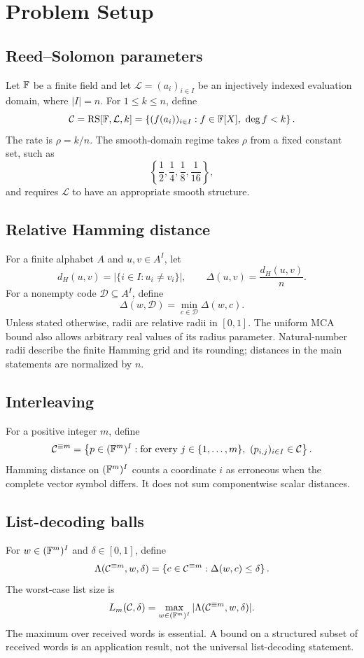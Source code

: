 \section{Problem Setup}

\subsection{Reed--Solomon parameters}

Let \(\mathbb{F}\) be a finite field and let
\(\mathcal L=(a_i)_{i\in I}\) be an injectively indexed evaluation domain,
where \(|I|=n\).  For \(1\le k\le n\), define
\[
  \mathcal C=\operatorname{RS}[\mathbb{F},\mathcal L,k]
  =
  \left\{
    (f(a_i))_{i\in I}:
    f\in\mathbb{F}[X],\ \deg f<k
  \right\}.
\]
The rate is \(\rho=k/n\).  The smooth-domain regime takes \(\rho\) from a fixed
constant set, such as
\[
  \left\{\frac12,\frac14,\frac18,\frac1{16}\right\},
\]
and requires \(\mathcal L\) to have an appropriate smooth structure.

\subsection{Relative Hamming distance}

For a finite alphabet \(A\) and \(u,v\in A^I\), let
\[
  d_H(u,v)=|\{i\in I:u_i\ne v_i\}|,
  \qquad
  \Delta(u,v)=\frac{d_H(u,v)}{n}.
\]
For a nonempty code \(\mathcal D\subseteq A^I\), define
\[
  \Delta(w,\mathcal D)
  =
  \min_{c\in\mathcal D}\Delta(w,c).
\]
Unless stated otherwise, radii are relative radii in \([0,1]\).
The uniform MCA bound also allows arbitrary real values of its radius
parameter. Natural-number radii describe the finite Hamming grid and its
rounding; distances in the main statements are normalized by \(n\).

\subsection{Interleaving}

For a positive integer \(m\), define
\[
  \mathcal C^{\equiv m}
  =
  \left\{
    p\in(\mathbb{F}^m)^I:
    \text{for every }j\in\{1,\ldots,m\},
    \ (p_{i,j})_{i\in I}\in\mathcal C
  \right\}.
\]
Hamming distance on \((\mathbb{F}^m)^I\) counts a coordinate \(i\) as erroneous when
the complete vector symbol differs.  It does not sum componentwise scalar
distances.

\subsection{List-decoding balls}

For \(w\in(\mathbb{F}^m)^I\) and \(\delta\in[0,1]\), define
\[
  \Lambda(\mathcal C^{\equiv m},w,\delta)
  =
  \left\{
    c\in\mathcal C^{\equiv m}:
    \Delta(w,c)\le\delta
  \right\}.
\]
The worst-case list size is
\[
  L_m(\mathcal C,\delta)
  =
  \max_{w\in(\mathbb{F}^m)^I}
    |\Lambda(\mathcal C^{\equiv m},w,\delta)|.
\]
The maximum over received words is essential.  A bound on a structured subset
of received words is an application result, not the universal list-decoding
statement.
